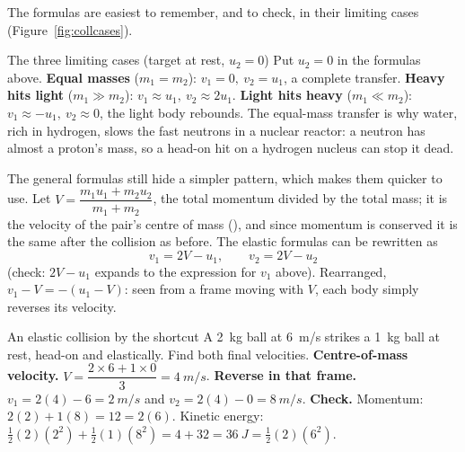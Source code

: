 The formulas are easiest to remember, and to check, in their limiting cases (Figure~\ref{fig:collcases}).

\begin{figure}[htbp]
\centering
{}
\end{figure}

\begin{keybox}{The three limiting cases (target at rest, $u_2=0$)}
Put $u_2=0$ in the formulas above.
\textbf{Equal masses} ($m_1=m_2$): $v_1=0,\ v_2=u_1$, a complete transfer. \textbf{Heavy hits light}
($m_1\gg m_2$): $v_1\approx u_1,\ v_2\approx 2u_1$. \textbf{Light hits heavy} ($m_1\ll m_2$):
$v_1\approx-u_1,\ v_2\approx0$, the light body rebounds. The equal-mass transfer is why water, rich in
hydrogen, slows the fast neutrons in a nuclear reactor: a neutron has almost a proton's mass, so a
head-on hit on a hydrogen nucleus can stop it dead.
\end{keybox}

The general formulas still hide a simpler pattern, which makes them quicker to use. Let
$V=\dfrac{m_1u_1+m_2u_2}{m_1+m_2}$, the total momentum divided by the total mass; it is the velocity of
the pair's centre of mass (), and since momentum is conserved it is the same after the
collision as before. The elastic formulas can be rewritten as
\[
v_1=2V-u_1,\qquad v_2=2V-u_2
\]
(check: $2V-u_1$ expands to the expression for $v_1$ above). Rearranged, $v_1-V=-(u_1-V)$: seen from a
frame moving with $V$, each body simply reverses its velocity.

\begin{exbox}{An elastic collision by the shortcut}
A \SI{2}{kg} ball at \SI{6}{m/s} strikes a \SI{1}{kg} ball at rest, head-on and elastically. Find both
final velocities.
 \textbf{Centre-of-mass velocity.} $V=\dfrac{2\times6+1\times0}{3}=\SI{4}{m/s}$.
 \textbf{Reverse in that frame.} $v_1=2(4)-6=\SI{2}{m/s}$ and $v_2=2(4)-0=\SI{8}{m/s}$.
 \textbf{Check.} Momentum: $2(2)+1(8)=12=2(6)$. Kinetic energy: $\tfrac12(2)(2^2)+\tfrac12(1)(8^2)
=4+32=\SI{36}{J}=\tfrac12(2)(6^2)$.\ \checkmark
{}
\end{exbox}

